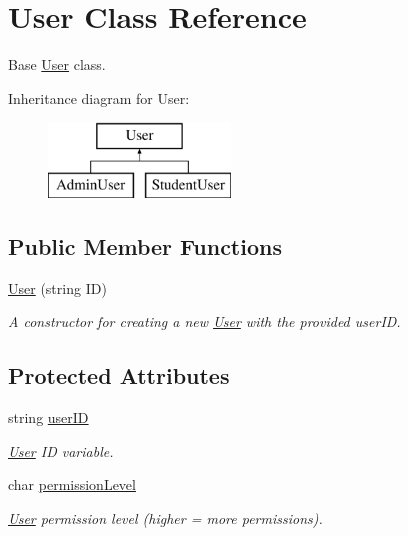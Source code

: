\hypertarget{class_user}{}\section{User Class Reference}
\label{class_user}


Base \hyperlink{class_user}{User} class.  


Inheritance diagram for User\+:\begin{figure}[H]
\begin{center}
\leavevmode
\includegraphics[height=2.000000cm]{class_user}
\end{center}
\end{figure}
\subsection*{Public Member Functions}
\begin{DoxyCompactItemize}
\item 
\hyperlink{class_user_a474a84c2e37b139228018a1aa9e814f7}{User} (string I\+D)
\begin{DoxyCompactList}\small\item\em A constructor for creating a new \hyperlink{class_user}{User} with the provided user\+I\+D. \end{DoxyCompactList}\end{DoxyCompactItemize}
\subsection*{Protected Attributes}
\begin{DoxyCompactItemize}
\item 
\hypertarget{class_user_a22f9e8d9729d3595e4ea9af8faea8abc}{}string \hyperlink{class_user_a22f9e8d9729d3595e4ea9af8faea8abc}{user\+I\+D}\label{class_user_a22f9e8d9729d3595e4ea9af8faea8abc}

\begin{DoxyCompactList}\small\item\em \hyperlink{class_user}{User} I\+D variable. \end{DoxyCompactList}\item 
\hypertarget{class_user_a6ae9d72fbd1c50a602b284b5fc659be7}{}char \hyperlink{class_user_a6ae9d72fbd1c50a602b284b5fc659be7}{permission\+Level}\label{class_user_a6ae9d72fbd1c50a602b284b5fc659be7}

\begin{DoxyCompactList}\small\item\em \hyperlink{class_user}{User} permission level (higher = more permissions). \end{DoxyCompactList}\end{DoxyCompactItemize}



